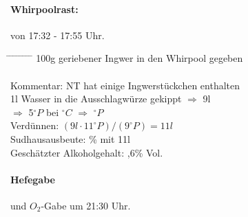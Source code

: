 \documentclass[12pt,oneside,a4paper]{scrartcl}
\begin{document}
\paragraph{Whirpoolrast:} von 17:32 - 17:55 Uhr.
	\begin{tabbing}
		\hspace{1cm} \= \hspace{1cm} \= \hspace{1cm} \= \hspace{1cm} \= \hspace{1cm} \= \hspace{1cm} \= \hspace{1cm} \= \hspace{1cm} \= \kill
		\> 100g geriebener Ingwer in den Whirpool gegeben\\\\
		\> Kommentar: \> \> \> NT hat einige Ingwerstückchen enthalten\\
		\> \> \> \> 1l Wasser in die Ausschlagwürze gekippt $\Rightarrow$ 9l\\
		\> \> $\Rightarrow$ 5$^\circ P$ \> \> bei $^\circ C$ \> $\Rightarrow$ $^\circ P$\\
		\> \> Verdünnen: \> \> \> \> \> $(9l \cdot 11^\circ P)/(9^\circ P)=11l$\\
		\> \> Sudhausausbeute: \> \> \> \>  \% mit 11l\\
		\> \> Geschätzter Alkoholgehalt: \> \> \> \> ,6\% Vol.
	\end{tabbing}
%
\paragraph{Hefegabe} und $O_2$-Gabe um 21:30 Uhr.
\end{document}
